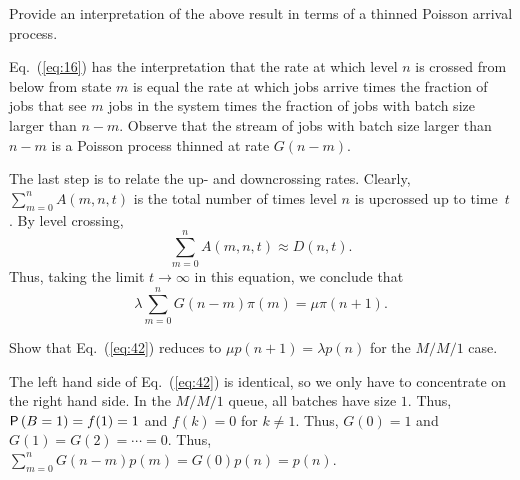 \begin{exercise}
Provide an interpretation of the above result in terms of a thinned Poisson arrival process.
\begin{solution}
Eq.~(\ref{eq:16}) has the interpretation that the rate at which
level $n$ is crossed from below from state $m$ is equal the rate at
which jobs arrive times the fraction of jobs that see $m$ jobs in the
system times the fraction of jobs with batch size larger than $n-m$.
Observe that the stream of jobs with batch size larger than $n-m$
is a Poisson process thinned at rate $G(n-m)$. 
\end{solution}
\end{exercise}


The last step is to relate the up- and downcrossing rates.  Clearly, $\sum_{m=0}^n A(m,n,t)$ is  the total number of times level $n$ is upcrossed up to time~$t$. By level crossing,
 \begin{equation*}
 \sum_{m=0}^n A(m,n,t) \approx  D(n,t). 
\end{equation*}
Thus, taking the limit $t\to\infty$ in this equation, we conclude that
\begin{equation}\label{eq:42}
\lambda  \sum_{m=0}^n G(n-m) \pi(m) = \mu \pi(n+1).
\end{equation}

\begin{exercise}
  Show that Eq.~(\ref{eq:42}) reduces to $\mu p(n+1)=\lambda p(n)$ for the $M/M/1$ case.
  \begin{solution}
    The left hand side of Eq.~(\ref{eq:42}) is identical, so we only
    have to concentrate on the right hand side. In the $M/M/1$ queue,
    all batches have size $1$. Thus, $\P{B=1} = f(1)=1$ and $f(k)=0$
    for $k\neq 1$. Thus, $G(0)=1$ and $G(1)=G(2)=\cdots = 0$. Thus,
    $\sum_{m=0}^n G(n-m) p(m) = G(0)p(n)=p(n)$.
  \end{solution}
\end{exercise}

